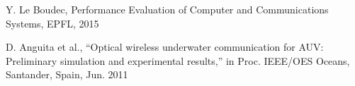 \documentclass[10pt]{article}
\begin{document}
\begin{thebibliography}{10}

Y. Le Boudec, Performance Evaluation of Computer and Communications Systems, EPFL, 2015

D. Anguita et al., “Optical wireless underwater communication for AUV: Preliminary simulation and experimental results,” in Proc. IEEE/OES Oceans, Santander, Spain, Jun. 2011

\end{thebibliography}
\end{document}
